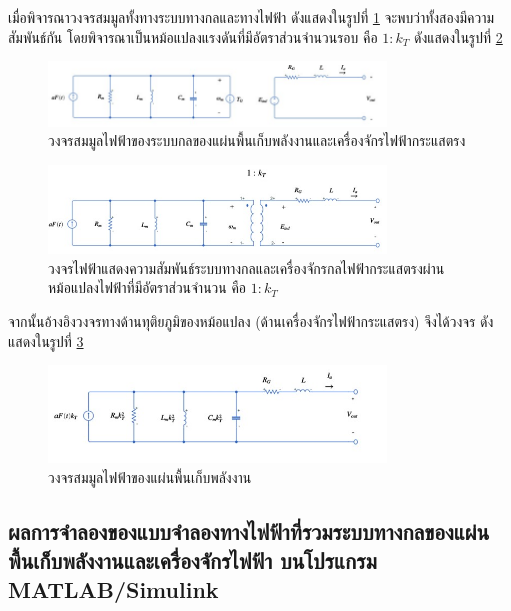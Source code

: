 \documentclass[11pt,a4paper]{article}
\begin{document}
เมื่อพิจารณาวงจรสมมูลทั้งทางระบบทางกลและทางไฟฟ้า ดังแสดงในรูปที่ \ref{mech_and_dc_motor_circuit} จะพบว่าทั้งสองมีความสัมพันธ์กัน โดยพิจารณาเป็นหม้อแปลงแรงดันที่มีอัตราส่วนจำนวนรอบ คือ $1 : k_{T}$ ดังแสดงในรูปที่ \ref{dc_tr}
\begin{figure}[H]
    \begin{center}
        \includegraphics[width=0.8\textwidth]{mech_and_dc_motor_circuit.jpg}
    \end{center}
    \caption{วงจรสมมูลไฟฟ้าของระบบกลของแผ่นพื้นเก็บพลังงานและเครื่องจักรไฟฟ้ากระแสตรง}
    \label{mech_and_dc_motor_circuit}
\end{figure}
\begin{figure}[H]
    \begin{center}
        \includegraphics[width=0.8\textwidth]{dc_tr.jpg}
    \end{center}
    \caption{วงจรไฟฟ้าแสดงความสัมพันธ์ระบบทางกลและเครื่องจักรกลไฟฟ้ากระแสตรงผ่านหม้อแปลงไฟฟ้าที่มีอัตราส่วนจำนวน คือ $1 : k_{T}$}
    \label{dc_tr}
\end{figure}
จากนั้นอ้างอิงวงจรทางด้านทุติยภูมิของหม้อแปลง (ด้านเครื่องจักรไฟฟ้ากระแสตรง) จึงได้วงจร ดังแสดงในรูปที่ \ref{genpath_cicuit}
\begin{figure}[H]
    \begin{center}
        \includegraphics[width=0.8\textwidth]{genpath_circuit.jpg}
    \end{center}
    \caption{วงจรสมมูลไฟฟ้าของแผ่นพื้นเก็บพลังงาน}
    \label{genpath_cicuit}
\end{figure}



\subsection{ผลการจำลองของแบบจำลองทางไฟฟ้าที่รวมระบบทางกลของแผ่นพื้นเก็บพลังงานและเครื่องจักรไฟฟ้า บนโปรแกรม MATLAB/Simulink}
\end{document}

